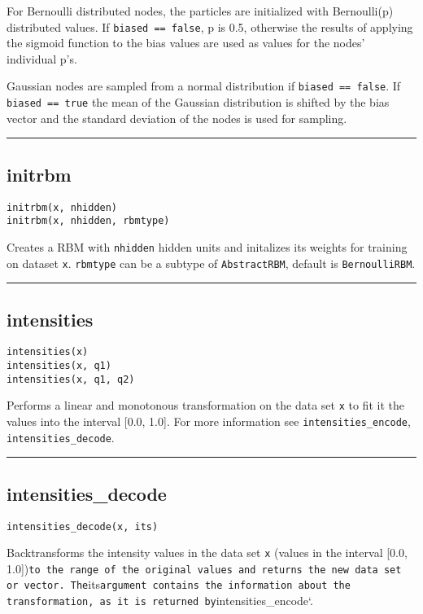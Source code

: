 For Bernoulli distributed nodes, the particles are initialized with Bernoulli(p) distributed values. If \texttt{biased == false}, p is 0.5, otherwise the results of applying the sigmoid function to the bias values are used as values for the nodes' individual p's.

Gaussian nodes are sampled from a normal distribution if \texttt{biased == false}. If \texttt{biased == true} the mean of the Gaussian distribution is shifted by the bias vector and the standard deviation of the nodes is used for sampling.

\noindent\rule{\textwidth}{1pt}
\subsection*{initrbm}
\begin{verbatim}
initrbm(x, nhidden)
initrbm(x, nhidden, rbmtype)
\end{verbatim}
Creates a RBM with \texttt{nhidden} hidden units and initalizes its weights for training on dataset \texttt{x}. \texttt{rbmtype} can be a subtype of \texttt{AbstractRBM}, default is \texttt{BernoulliRBM}.

\noindent\rule{\textwidth}{1pt}
\subsection*{intensities}
\begin{verbatim}
intensities(x)
intensities(x, q1)
intensities(x, q1, q2)
\end{verbatim}
Performs a linear and monotonous transformation on the data set \texttt{x} to fit it the values into the interval [0.0, 1.0]. For more information see \texttt{intensities\_encode}, \texttt{intensities\_decode}.

\noindent\rule{\textwidth}{1pt}
\subsection*{intensities\_decode}
\begin{verbatim}
intensities_decode(x, its)
\end{verbatim}
Backtransforms the intensity values in the data set \texttt{x} (values in the interval [0.0, 1.0])\texttt{to the range of the original values and returns the new data set or vector. The}its\texttt{argument contains the information about the transformation, as it is returned by}intensities\_encode`.

